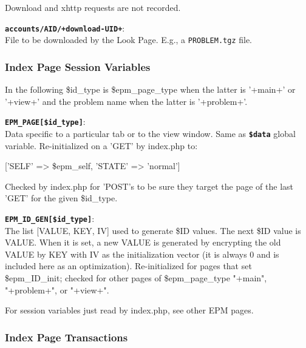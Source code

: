 \documentclass[12pt]{article}
\newenvironment{indpar}[1][0.4in]%
	{\begin{list}{}%
		     {\setlength{\itemsep}{0in}%
		      \setlength{\topsep}{0in}%
		      \setlength{\parsep}{1ex}%
		      \setlength{\labelwidth}{#1}%
		      \setlength{\leftmargin}{#1}%
		      \addtolength{\leftmargin}{\labelsep}}%
	 \item}%
	{\end{list}}
\newenvironment{itemlist}[1][0.2in]%
	{\begin{list}{}{\setlength{\labelwidth}{#1}%
		        \setlength{\leftmargin}{\labelwidth}%
		        \addtolength{\leftmargin}{+0.2in}%
		        \addtolength{\linewidth}{-\labelwidth}%
		        \addtolength{\linewidth}{-0.2in}%
		        \renewcommand{\makelabel}[1]{##1\hfill}}
	 \raggedright}%
	{\end{list}}
\newcommand{\TT}[1]{{\tt \bfseries #1}}
\begin{document}
\begin{indpar}
\begin{itemlist}
Download and xhttp requests are not recorded.

\item[\TT{accounts/AID/+download-UID+}:]~
\label{ACCOUNTS/AID/DOWNLOAD} \\
File to be downloaded by the Look Page.
E.g., a {\tt PROBLEM.tgz} file.



\end{itemlist}
\end{indpar}

\subsubsection{Index Page Session Variables}

\begin{indpar}[0.2in]
In the following \$id\_type is \$epm\_page\_type
when the latter is '+main+' or '+view+' and the problem
name when the latter is '+problem+'.
\begin{itemlist}
\item[\TT{EPM\_PAGE[\$id\_type]}:]~
\label{EPM_PAGE} \\
      Data specific to a particular tab or to the view
      window.  Same as \TT{\$data} global variable.
      Re-initialized on a 'GET' by index.php to:

      \centerline{ ['SELF' => \$epm\_self, 'STATE' => 'normal'] }

      Checked by index.php for 'POST's to be sure they target the
      page of the last 'GET' for the given \$id\_type.

\item[\TT{EPM\_ID\_GEN[\$id\_type]}:]~
\label{EPM_ID_GEN} \\
      The list [VALUE, KEY, IV] used to generate \$ID
      values.  The next \$ID value is VALUE.  When it
      is set, a new VALUE is generated by encrypting the
      old VALUE by KEY with IV as
      the initialization vector (it is always 0 and
      is included here as an optimization).
      Re-initialized for pages that set \$epm\_ID\_init;
      checked for other pages of \$epm\_page\_type
      "+main", "+problem+", or "+view+".


\end{itemlist}
\end{indpar}

For session variables just read by index.php, see other
EPM pages.

\subsubsection{Index Page Transactions}
\end{document}
